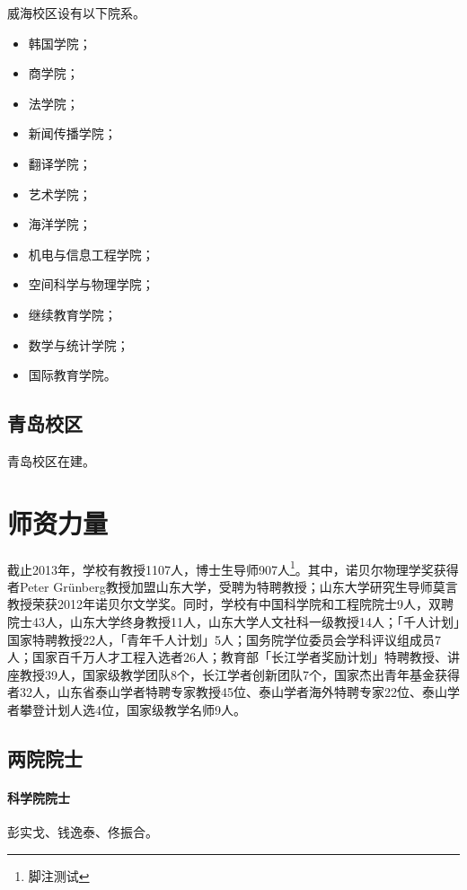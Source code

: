 \documentclass[openany]{sduthesis} %
\begin{document}
威海校区设有以下院系。

\begin{itemize}
  \item 韩国学院；
  \item 商学院；
  \item 法学院；
  \item 新闻传播学院；
  \item 翻译学院；
  \item 艺术学院；
  \item 海洋学院；
  \item 机电与信息工程学院；
  \item 空间科学与物理学院；
  \item 继续教育学院；
  \item 数学与统计学院；
  \item 国际教育学院。
\end{itemize}

\subsection{青岛校区}

青岛校区在建。

\section{师资力量}

截止2013年，学校有教授1107人，博士生导师907人\footnote{脚注测试}。其中，诺贝尔物理学奖获得者Peter Grünberg教授加盟山东大学，受聘为特聘教授；山东大学研究生导师莫言教授荣获2012年诺贝尔文学奖。同时，学校有中国科学院和工程院院士9人，双聘院士43人，山东大学终身教授11人，山东大学人文社科一级教授14人；「千人计划」国家特聘教授22人，「青年千人计划」5人；国务院学位委员会学科评议组成员7人；国家百千万人才工程入选者26人；教育部「长江学者奖励计划」特聘教授、讲座教授39人，国家级教学团队8个，长江学者创新团队7个，国家杰出青年基金获得者32人，山东省泰山学者特聘专家教授45位、泰山学者海外特聘专家22位、泰山学者攀登计划人选4位，国家级教学名师9人。

\subsection{两院院士}

\paragraph{科学院院士}彭实戈、钱逸泰、佟振合。
\end{document}
